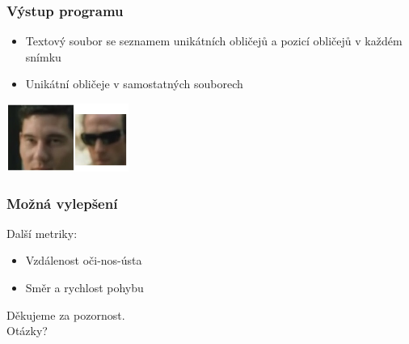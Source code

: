 \documentclass{beamer}
\begin{document}
	\begin{frame}[t,fragile]
		\frametitle{Výstup programu}	
		
		\begin{itemize}
			\item Textový soubor se seznamem unikátních obličejů a pozicí obličejů v každém snímku	
			\item Unikátní obličeje v samostatných souborech
		\end{itemize}
		\centering\includegraphics[width=4cm]{img/faces.jpg}
			
	
	\end{frame}				
	
	\begin{frame}[t,fragile]
		\frametitle{Možná vylepšení}	
		Další metriky:
		\begin{itemize}
			\item Vzdálenost oči-nos-ústa
			\item Směr a rychlost pohybu
		\end{itemize}		
					
	\end{frame}			
	
	\begin{frame}[t,fragile]

		\vspace{30mm}
\centering
\Huge Děkujeme za pozornost.\\ Otázky?
						
		
	\end{frame}

	
\end{document}

